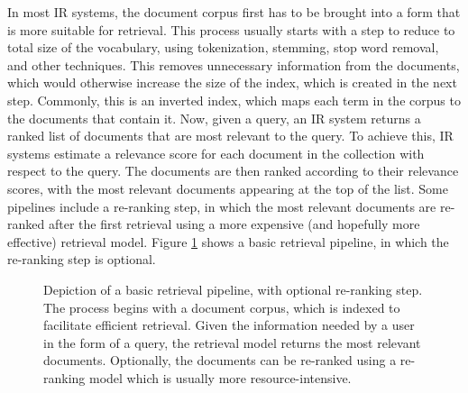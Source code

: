 In most IR systems, the document corpus first has to be brought into a form that is more suitable for retrieval.
This process usually starts with a step to reduce to total size of the vocabulary, using tokenization, stemming, stop word removal, and other techniques.
This removes unnecessary information from the documents, which would otherwise increase the size of the index, which is created in the next step.
Commonly, this is an inverted index, which maps each term in the corpus to the documents that contain it.
Now, given a query, an IR system returns a ranked list of documents that are most relevant to the query.
To achieve this, IR systems estimate a relevance score for each document in the collection with respect to the query.
The documents are then ranked according to their relevance scores, with the most relevant documents appearing at the top of the list.
Some pipelines include a re-ranking step, in which the most relevant documents are re-ranked after the first retrieval using a more expensive (and hopefully more effective) retrieval model.
Figure \ref{fig:reranking_pipeline} shows a basic retrieval pipeline, in which the re-ranking step is optional.
\begin{figure}[tb]
\centering
{}
\caption{Depiction of a basic retrieval pipeline, with optional re-ranking step. The process begins with a document corpus, which is indexed to facilitate efficient retrieval. Given the information needed by a user in the form of a query, the retrieval model returns the most relevant documents. Optionally, the documents can be re-ranked using a re-ranking model which is usually more resource-intensive.}
\label{fig:reranking_pipeline}
\end{figure}

